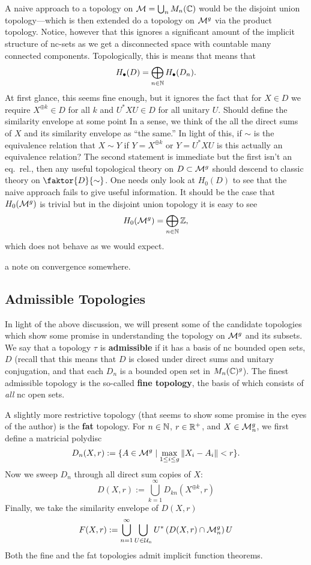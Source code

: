 A naive approach to a topology on \(\mathcal{M} = \bigcup_n M_n(\mathbb{C})\) would be the
disjoint union topology---which is then extended do a topology on \(\mathcal{M}^g\) via
the product topology. Notice, however that this ignores a significant amount of
the implicit structure of nc-sets as we get a disconnected space with countable
many connected components. Topologically, this is means that means that
\[
  H_\bullet (D) = \bigoplus_{n \in \mathbb{N} } H_\bullet(D_n).
\]
At first glance, this seems fine enough, but it ignores the fact that for
\(X \in D\) we require \(X^{\oplus k} \in D\) for all \(k\) and \(U^*XU \in D\)
for all unitary \(U\). {\color{blue} Should define the similarity envelope at
  some point} In a sense, we think of the all the direct sums of \(X\) and its
similarity envelope as ``the same.'' In light of this, if \(\sim\) is the
equivalence relation that \(X\sim Y\) if \(Y = X^{\oplus k}\) or \(Y = U^*XU\)
{\color{red} is this actually an equivalence relation? The second statement is
  immediate but the first isn't an eq.\ rel.},
then any useful topological theory on \(D \subset \mathcal{M}^g\) should descend to
classic theory on \(\faktor{D}{\sim}\). One needs only look at \(H_0(D)\) to see
that the naive approach fails to give useful information. It should be the case
that \(H_0(\mathcal{M}^{g} )\) is trivial but in the disjoint union topology it is easy
to see
\[
  H_0(\mathcal{M}^{g} ) = \bigoplus_{n \in \mathbb{N} } \mathbb{Z} ,
\]
which does not behave as we would expect.

{\color{blue} a note on convergence somewhere.}

\subsection{Admissible Topologies}%
\label{sec:admtopo}

In light of the above discussion, we will present some of the candidate
topologies which show some promise in understanding the topology on \(\mathcal{M}^g\)
and its subsets.
We say that a topology \(\tau\) is \textbf{admissible} if it has a basis of nc
bounded open sets, \(D\) (recall that this means that \(D\) is closed under
direct sums and unitary conjugation, and that each \(D_n\) is a bounded open set
in \(M_n(\mathbb{C})^g\)). The finest admissible topology is the so-called \textbf{fine
  topology},
the basis of which consists of \emph{all} nc open sets.

A slightly more restrictive topology (that seems to show some promise in the eyes
of the author) is the \textbf{fat} topology. For \(n \in \mathbb{N} \),
\(r \in \mathbb{R} ^+\), and \(X \in \mathcal{M}^g_n\), we first define a matricial polydisc
\[
  D_n(X,r) := \{A \in \mathcal{M}^g \mid \max_{1\leq i\leq g} \| X_i-A_i \| <r\}.
\]
Now we sweep \(D_n\) through all direct sum copies of \(X\):
\[
  D(X,r) := \bigcup_{k=1}^\infty D_{kn} (X^{\oplus k},r)
\]
Finally, we take the similarity envelope of \(D(X,r)\)
\[
  F(X,r) :=  \bigcup_{n=1}^\infty \bigcup_{U \in \mathcal{U}_n} U^* \left( D(X,r) \cap \mathcal{M}^g_n \right) U
\]
Both the fine and the fat topologies admit implicit function theorems.

